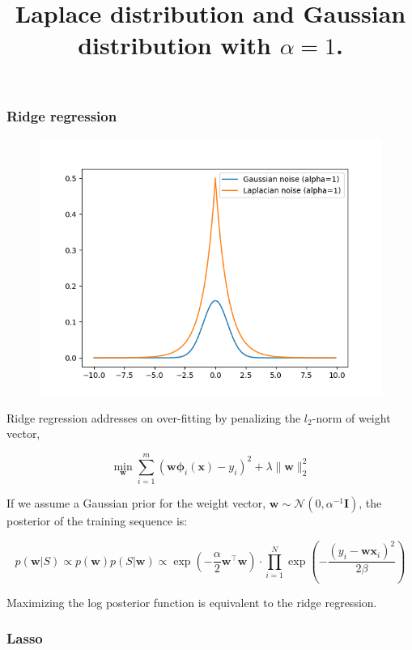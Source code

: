 \documentclass{article}
\begin{document}
\subsubsection{Ridge regression}
	\begin{figure}
	\includegraphics[scale=.3]{C4-1.png}	
	\title{\small{Laplace distribution and Gaussian distribution with $\alpha=1$.}}
	\end{figure}
	Ridge regression addresses on over-fitting by penalizing the $l_2$-norm of weight vector,
	
	\begin{equation*}
	\min_\mathbf{w} \sum_{i=1}^m (\mathbf{w\phi}_i(\mathbf{x}) - y_i)^2 + \lambda\|\mathbf{w}\|^2_2
	\end{equation*}

	If we assume a Gaussian prior for the weight vector, $\mathbf{w}\sim\mathcal{N}(0,\alpha^{-1}\mathbf{I})$,  the posterior of the training sequence is:
	
	\begin{equation}
	p(\mathbf{w}|S) \propto p(\mathbf{w}) p(S|\mathbf{w}) \propto \exp \left( -\frac{\alpha}{2} \mathbf{w}^\top \mathbf{w} \right) \cdot \prod_{i=1}^N \exp \left( -\frac{(y_i-\mathbf{wx}_i)^2}{2\beta} \right) 
	\end{equation}
	
Maximizing the log posterior function is equivalent to the ridge regression.
	
	
\subsubsection{Lasso}
\end{document}
